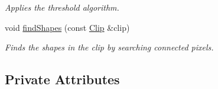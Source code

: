 \begin{CompactItemize}
\begin{CompactList}\small\item\em Applies the threshold algorithm. \item\end{CompactList}\item 
void \hyperlink{class_segmenter_465c8e755bb56d247add080a04377520}{findShapes} (const \hyperlink{class_clip}{Clip} \&clip)
\begin{CompactList}\small\item\em Finds the shapes in the clip by searching connected pixels. \item\end{CompactList}\end{CompactItemize}
\subsection*{Private Attributes}
